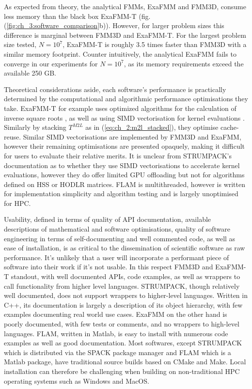 As expected from theory, the analytical FMMs, ExaFMM and FMM3D, consume less memory than the black box ExaFMM-T (fig. (\ref{fig:ch_3:software_comparison}b)). However, for larger problem sizes this difference is marginal between FMM3D and ExaFMM-T. For the largest problem size tested, $N=10^7$, ExaFMM-T is roughly 3.5 times faster than FMM3D with a similar memory footprint. Counter intuitively, the analytical ExaFMM fails to converge in our experiments for $N=10^7$, as its memory requirements exceed the available 250 GB. 

Theoretical considerations aside, each software's performance is practically determined by the computational and algorithmic performance optimisations they take. ExaFMM-T for example uses optimized algorithms for the calculation of inverse square roots \cite{malhotra2015pvfmm}, as well as using SIMD vectorisation for kernel evaluations \cite{wang2021exafmm}. Similarly by stacking $T^{M2L}$ as in (\ref{eq:ch_2:m2l_stacked}), they optimise cache-reuse. Similar SIMD vectorisations are implemented by FMM3D and ExaFMM, however their remaining optimisations are presented opaquely, making it difficult for users to evaluate their relative merits. It is unclear from STRUMPACK's documentation as to whether they use SIMD vectorisations to accelerate kernel evaluations, however they do offer limited GPU offloading but not for algorithms defined on HSS or HODLR matrices. FLAM is multithreaded, however is written for implementation simplicity and algorithm testing and is largely unoptimised for HPC.

Usability, defined in terms of quality of API documentation, available descriptions of mathematical and software optimisations,  quality of software engineering in terms of self-documenting and well commented code, as well as ease of installation, is as critical to the dissemination of scientific software as raw performance. It's unlikely that a user will incorporate a performant piece of software into their work if it's not usable. In this respect FMM3D and ExaFMM-T standout, with well documented APIs, code examples, as well as wrappers to call functionality from higher level languages. STRUMPACK, though relatively well documented, does not support wrappers to higher-level languages. Written in C++, its documentation is largely a description of its object hierarchy, with few examples documenting real world use cases. ExaFMM on the other hand is poorly documented, with few tests or comments, and no wrappers to high-level languages. FLAM, written in Matlab, is easy to install with numerous code examples as well as good documentation. Most softwares, except STRUMPACK which is distributed via the SPACK package manager and FLAM which is a Matlab package, have traditional source builds based on CMake and Make. Local installation can therefore be challenging when building on non-traditional HPC operating systems such as Windows and MacOS.

